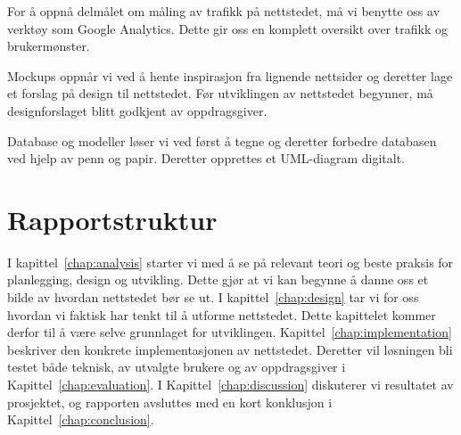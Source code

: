 For å oppnå delmålet om måling av trafikk på nettstedet, må vi benytte oss av verktøy som Google Analytics. Dette gir oss en komplett oversikt over trafikk og brukermønster.

Mockups oppnår vi ved å hente inspirasjon fra lignende nettsider og deretter lage et forslag på design til nettstedet. Før utviklingen av nettstedet begynner, må designforslaget blitt godkjent av oppdragsgiver.

Database og modeller løser vi ved først å tegne og deretter forbedre databasen ved hjelp av penn og papir. Deretter opprettes et UML-diagram digitalt.

\section{Rapportstruktur}



I kapittel~\ref{chap:analysis} starter vi med å se på relevant teori og beste praksis for planlegging, design og utvikling. Dette gjør at vi kan begynne å danne oss et bilde av hvordan nettstedet bør se ut. I kapittel~\ref{chap:design} tar vi for oss hvordan vi faktisk har tenkt til å utforme nettstedet. Dette kapittelet kommer derfor til å være selve grunnlaget for utviklingen. Kapittel~\ref{chap:implementation} beskriver den konkrete implementasjonen av nettstedet. Deretter vil løsningen bli testet både teknisk, av utvalgte brukere og av oppdragsgiver i Kapittel~\ref{chap:evaluation}. I Kapittel~\ref{chap:discussion} diskuterer vi resultatet av prosjektet, og rapporten avsluttes med en kort konklusjon i Kapittel~\ref{chap:conclusion}.
